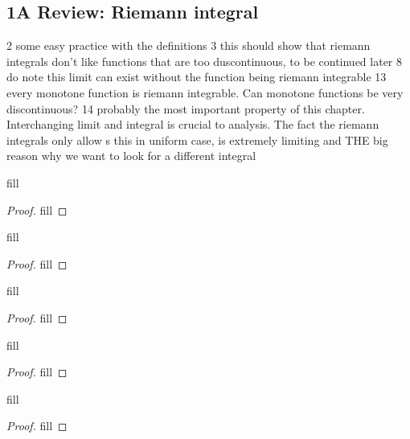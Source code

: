 \subsection{1A Review: Riemann integral}

2 some easy practice with the definitions
3 this should show that riemann integrals don't like functions that are too duscontinuous, to be continued later
8 do note this limit can exist without the function being riemann integrable
13 every monotone function is riemann integrable. Can monotone functions be very discontinuous?
14 probably the most important property of this chapter. Interchanging limit and integral is crucial to analysis. The fact the riemann integrals only allow s this in uniform case, is extremely limiting and THE big reason why we want to look for a different integral

\begin{exercise}{2}
fill
\end{exercise}
\begin{proof}
fill
\end{proof} 

\begin{exercise}{3}
fill
\end{exercise}
\begin{proof}
fill
\end{proof} 

\begin{exercise}{8}
fill
\end{exercise}
\begin{proof}
fill
\end{proof} 

\begin{exercise}{13}
fill
\end{exercise}
\begin{proof}
fill
\end{proof} 

\begin{exercise}{14}
fill
\end{exercise}
\begin{proof}
fill
\end{proof} 
